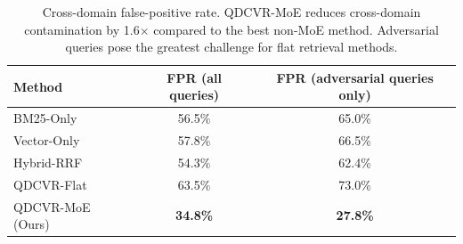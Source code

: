 \begin{table}[t]
\centering
\caption{Cross-domain false-positive rate. QDCVR-MoE reduces cross-domain contamination by 1.6$\times$ compared to the best non-MoE method. Adversarial queries pose the greatest challenge for flat retrieval methods.}
\label{tab:crossdomain}
\begin{tabular}{lcc}
\toprule
\textbf{Method} & \textbf{FPR (all queries)} & \textbf{FPR (adversarial queries only)} \\
\midrule
    BM25-Only                & {56.5\%} & {65.0\%} \\
    Vector-Only              & {57.8\%} & {66.5\%} \\
    Hybrid-RRF               & {54.3\%} & {62.4\%} \\
    QDCVR-Flat               & {63.5\%} & {73.0\%} \\
    QDCVR-MoE (Ours)         & \textbf{34.8\%} & \textbf{27.8\%} \\
\bottomrule
\end{tabular}
\end{table}
